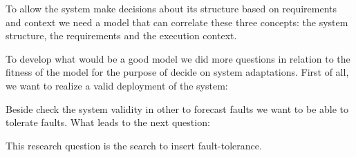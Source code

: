 

To allow the system make decisions about its structure based on requirements and context we need a model that can correlate these three concepts: the system structure, the requirements and the execution context.



\setlength{\fboxsep}{10pt}
\noindent{}\bigskip


To develop what would be a good model we did more questions in relation to the fitness of the model for the purpose of decide on system adaptations. First of all, we want to realize a valid deployment of the system:

\setlength{\fboxsep}{10pt}
\noindent{}\bigskip

Beside check the system validity in other to forecast faults we want to be able to tolerate faults. What leads to the next question:

\setlength{\fboxsep}{10pt}
\noindent{}\bigskip

This research question is the search to insert fault-tolerance.
